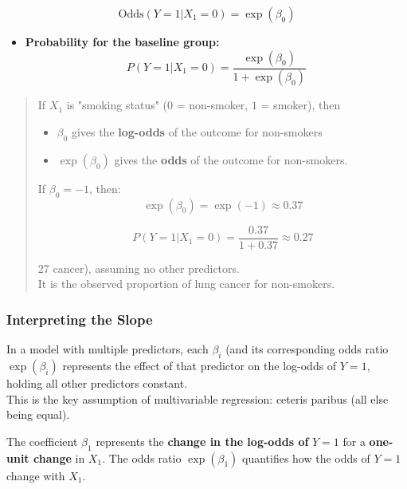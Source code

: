 \documentclass{article}
\providecommand{\tightlist}{%
  \setlength{\itemsep}{0pt}\setlength{\parskip}{0pt}}
\begin{document}
\[\text{Odds}(Y=1 | X_1=0) = \exp(\beta_0)\]
\begin{itemize}
\tightlist
\item
  \textbf{Probability for the baseline group:}
  \[P(Y=1 | X_1=0)=\dfrac{\exp(\beta_0)}{1 + \exp(\beta_0)}\]
\end{itemize}

\begin{quote}
If \(X_1\)\hspace{0pt} is "smoking status" (\(0\) = non-smoker, \(1\) =
smoker), then

\begin{itemize}
\tightlist
\item
  \(\beta_0\)\hspace{0pt} gives the \textbf{log-odds} of the outcome for
  non-smokers\\
\item
  \(\exp(\beta_0)\) gives the \textbf{odds} of the outcome for
  non-smokers.
\end{itemize}

If \(\beta_0 = -1\), then: \[\exp(\beta_0) = \exp(-1) \approx 0.37\]

\[P(Y=1 | X_1=0)= \dfrac{0.37}{1 + 0.37} \approx 0.27\]

27%
cancer), assuming no other predictors.\\
It is the observed proportion of lung cancer for non-smokers.
\end{quote}

\subsubsection{\texorpdfstring{\textbf{Interpreting the
Slope}}{Interpreting the Slope}}\label{interpreting-the-slope}

In a model with multiple predictors, each \(\beta_i\)\hspace{0pt} (and
its corresponding odds ratio \(\exp(\beta_i)\) represents the effect of
that predictor on the log-odds of \(Y=1\), holding all other predictors
constant.\\
This is the key assumption of multivariable regression: ceteris paribus
(all else being equal).

The coefficient \(\beta_1\)\hspace{0pt} represents the \textbf{change in
the log-odds of} \(Y=1\) for a \textbf{one-unit change} in
\(X_1\)\hspace{0pt}. The odds ratio \(\exp(\beta_1)\)\hspace{0pt}
quantifies how the odds of \(Y=1\) change with \(X_1\)\hspace{0pt}.
\end{document}
